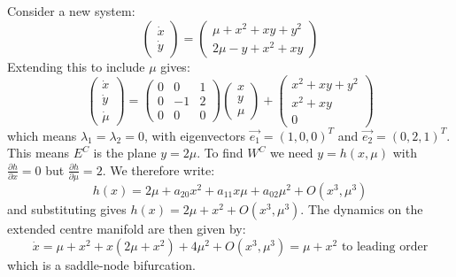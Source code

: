 \documentclass[../Main.tex]{subfiles}
\begin{document}
\begin{example}
    Consider a new system:
    \begin{equation*}
        \begin{pmatrix}\dot x \\ \dot y\end{pmatrix} =
        \begin{pmatrix}\mu + x^2 + xy + y^2 \\ 2\mu - y + x^2 + xy\end{pmatrix}
    \end{equation*}
    Extending this to include $\mu$ gives:
    \begin{equation*}
        \begin{pmatrix}\dot x \\ \dot y \\ \dot \mu\end{pmatrix} =
        \begin{pmatrix}
            0 & 0 & 1 \\
            0 & -1 & 2 \\
            0 & 0 & 0
        \end{pmatrix}
        \begin{pmatrix}x \\ y \\ \mu\end{pmatrix}
         + \begin{pmatrix}x^2 + xy + y^2 \\ x^2 + xy \\ 0\end{pmatrix}
    \end{equation*}
    which means $\lambda_1 = \lambda_2 = 0$, with eigenvectors $\vec{e_1} = (1, 0, 0)^T$ and $\vec{e_2} = (0, 2, 1)^T$. This means $E^C$ is the plane $y = 2\mu$. To find $W^C$ we need $y = h(x, \mu)$ with $\frac{\partial h}{\partial x} = 0$ but $\frac{\partial h}{\partial \mu} = 2$. We therefore write:
    \begin{equation*}
        h(x) = 2\mu + a_{20} x^2 + a_{11} x\mu + a_{02} \mu^2 + O(x^3, \mu^3)
    \end{equation*}
    and substituting gives $h(x) = 2\mu + x^2 + O(x^3, \mu^3)$. The dynamics on the extended centre manifold are then given by:
    \begin{equation*}
        \dot{x} = \mu + x^2 + x(2\mu + x^2) + 4\mu^2 + O(x^3, \mu^3) = \mu + x^2 \text{ to leading order}
    \end{equation*}
    which is a saddle-node bifurcation.
\end{example}
\end{document}
